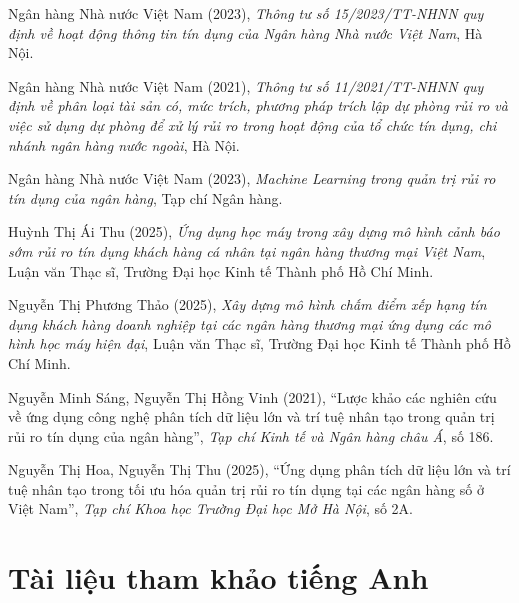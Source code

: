 \begin{enumerate}[label={[\arabic*]}, ref=\arabic*, leftmargin=*, labelsep=0.6em,
                  itemsep=5pt]

\item\label{ref:tt15} Ngân hàng Nhà nước Việt Nam (2023), \textit{Thông tư số
15/2023/TT-NHNN quy định về hoạt động thông tin tín dụng của Ngân hàng Nhà nước
Việt Nam}, Hà Nội.

\item\label{ref:tt11} Ngân hàng Nhà nước Việt Nam (2021), \textit{Thông tư số
11/2021/TT-NHNN quy định về phân loại tài sản có, mức trích, phương pháp trích
lập dự phòng rủi ro và việc sử dụng dự phòng để xử lý rủi ro trong hoạt động của
tổ chức tín dụng, chi nhánh ngân hàng nước ngoài}, Hà Nội.

\item\label{ref:nhnn-ml} Ngân hàng Nhà nước Việt Nam (2023), \textit{Machine
Learning trong quản trị rủi ro tín dụng của ngân hàng}, Tạp chí Ngân hàng.

\item\label{ref:thu2025} Huỳnh Thị Ái Thu (2025), \textit{Ứng dụng học máy trong
xây dựng mô hình cảnh báo sớm rủi ro tín dụng khách hàng cá nhân tại ngân hàng
thương mại Việt Nam}, Luận văn Thạc sĩ, Trường Đại học Kinh tế Thành phố Hồ Chí
Minh.

\item\label{ref:thao2025} Nguyễn Thị Phương Thảo (2025), \textit{Xây dựng mô hình
chấm điểm xếp hạng tín dụng khách hàng doanh nghiệp tại các ngân hàng thương mại
ứng dụng các mô hình học máy hiện đại}, Luận văn Thạc sĩ, Trường Đại học Kinh tế
Thành phố Hồ Chí Minh.

\item\label{ref:sang2021} Nguyễn Minh Sáng, Nguyễn Thị Hồng Vinh (2021),
``Lược khảo các nghiên cứu về ứng dụng công nghệ phân tích dữ liệu lớn và trí tuệ
nhân tạo trong quản trị rủi ro tín dụng của ngân hàng'', \textit{Tạp chí Kinh tế
và Ngân hàng châu Á}, số 186.

\item\label{ref:hoa2025} Nguyễn Thị Hoa, Nguyễn Thị Thu (2025), ``Ứng dụng phân
tích dữ liệu lớn và trí tuệ nhân tạo trong tối ưu hóa quản trị rủi ro tín dụng
tại các ngân hàng số ở Việt Nam'', \textit{Tạp chí Khoa học Trường Đại học Mở Hà
Nội}, số 2A.

\end{enumerate}

\section*{Tài liệu tham khảo tiếng Anh}


